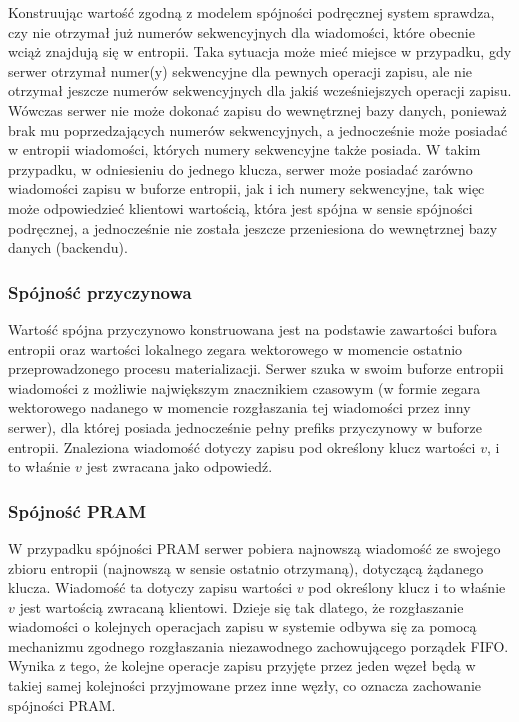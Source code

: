 Konstruując wartość zgodną z modelem spójności podręcznej system sprawdza, czy nie otrzymał już numerów sekwencyjnych dla wiadomości, które obecnie wciąż znajdują się w entropii. Taka sytuacja może mieć miejsce w przypadku, gdy serwer otrzymał numer(y) sekwencyjne dla pewnych operacji zapisu, ale nie otrzymał jeszcze numerów sekwencyjnych dla jakiś wcześniejszych operacji zapisu. Wówczas serwer nie może dokonać zapisu do wewnętrznej bazy danych, ponieważ brak mu poprzedzających numerów sekwencyjnych, a jednocześnie może posiadać w entropii wiadomości, których numery sekwencyjne także posiada. W takim przypadku, w odniesieniu do jednego klucza, serwer może posiadać zarówno wiadomości zapisu w buforze entropii, jak i ich numery sekwencyjne, tak więc może odpowiedzieć klientowi wartością, która jest spójna w sensie spójności podręcznej, a jednocześnie nie została jeszcze przeniesiona do wewnętrznej bazy danych (backendu). %

\subsubsection{Spójność przyczynowa}

Wartość spójna przyczynowo konstruowana jest na podstawie zawartości bufora entropii oraz wartości lokalnego zegara wektorowego w momencie ostatnio przeprowadzonego procesu materializacji. Serwer szuka w swoim buforze entropii wiadomości z możliwie największym znacznikiem czasowym (w formie zegara wektorowego nadanego w momencie rozgłaszania tej wiadomości przez inny serwer), dla której posiada jednocześnie pełny prefiks przyczynowy w buforze entropii. Znaleziona wiadomość dotyczy zapisu pod określony klucz wartości $ v $, i to właśnie $ v $ jest zwracana jako odpowiedź.

\subsubsection{Spójność PRAM}

W przypadku spójności PRAM serwer pobiera najnowszą wiadomość ze swojego zbioru entropii (najnowszą w sensie ostatnio otrzymaną), dotyczącą żądanego klucza. Wiadomość ta dotyczy zapisu wartości $ v $ pod określony klucz i to właśnie $ v $ jest wartością zwracaną klientowi. Dzieje się tak dlatego, że rozgłaszanie wiadomości o kolejnych operacjach zapisu w systemie odbywa się za pomocą mechanizmu zgodnego rozgłaszania niezawodnego zachowującego porządek FIFO. Wynika z tego, że kolejne operacje zapisu przyjęte przez jeden węzeł będą w takiej samej kolejności przyjmowane przez inne węzły, co oznacza zachowanie spójności PRAM.

